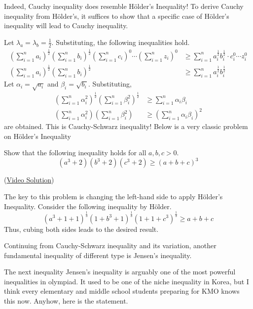 \documentclass[../../../main.tex]{subfiles}
\begin{document}
Indeed, Cauchy inequality does resemble Hölder's Inequality!
To derive Cauchy inequality from Hölder's, it suffices to show
that a specific case of Hölder's inequality will lead to
Cauchy inequality.

Let $\lambda_a = \lambda_b = \frac{1}{2}$. Substituting,
the following inequalities hold.
\begin{align*}
    \left( \sum_{i=1}^n a_i \right)^\frac{1}{2}
    \left( \sum_{i=1}^n b_i \right)^\frac{1}{2}
    \left( \sum_{i=1}^n c_i \right)^0 \cdots
    \left( \sum_{i=1}^n z_i \right)^0
    &\geq
    \sum_{i=1}^n
        a_i^{\frac{1}{2}} b_i^{\frac{1}{2}} \cdot
        c_i^0 \cdots z_i^0 \\
    \left( \sum_{i=1}^n a_i \right)^\frac{1}{2}
    \left( \sum_{i=1}^n b_i \right)^\frac{1}{2}
    &\geq
    \sum_{i=1}^n a_i^\frac{1}{2} b_i^\frac{1}{2}
\end{align*}
Let $\alpha_i = \sqrt{a_i}$ and $\beta_i = \sqrt{b_i}$. Substituting,
\begin{align*}
    \left( \sum_{i=1}^n \alpha_i^2 \right)^\frac{1}{2}
        \left( \sum_{i=1}^n \beta_i^2 \right)^\frac{1}{2}
    &\geq \sum_{i=1}^n \alpha_i \beta_i \\
    \left( \sum_{i=1}^n \alpha_i^2 \right)
        \left( \sum_{i=1}^n \beta_i^2 \right)
    &\geq \left( \sum_{i=1}^n \alpha_i \beta_i \right)^2
\end{align*}
are obtained. This is Cauchy-Schwarz inequality! Below is a very
classic problem on Hölder's Inequality

\begin{problem}{}{}
Show that the following inequality holds for all $a, b, c > 0$.
\vspace{-0.8\baselineskip}
\[
(a^3 + 2)(b^3 + 2)(c^3 + 2) \geq (a + b + c)^3
\]
\end{problem}
(\href{https://youtu.be/FUtgo54gq7I}{Video Solution})
\begin{solution}
The key to this problem is changing the left-hand side to apply
Hölder's Inequality. Consider the following inequality by Hölder.
\[
(a^3 + 1 + 1)^\frac{1}{3} (1 + b^3 + 1)^\frac{1}{3}
    (1 + 1 + c^3)^\frac{1}{3}
\geq a + b + c
\]
Thus, cubing both sides leads to the desired result.
\end{solution}

Continuing from Cauchy-Schwarz inequality and its variation, another
fundamental inequality of different type is Jensen's inequality.

The next inequality Jensen's inequality is arguably one of the most
powerful inequalities in olympiad. It used to be one of the niche
inequality in Korea, but I think every elementary and middle school
students preparing for KMO knows this now. Anyhow, here is the
statement.
\end{document}
